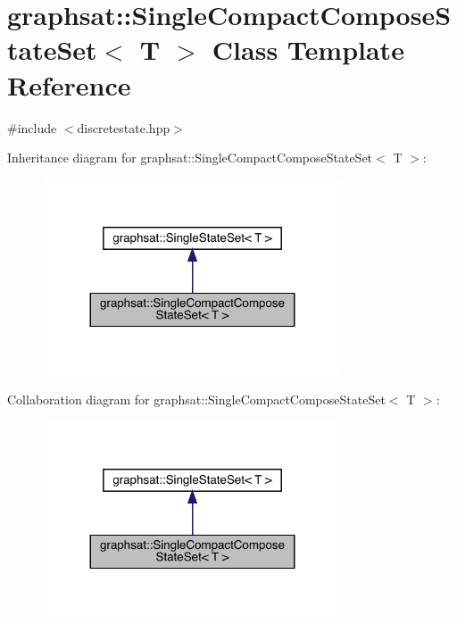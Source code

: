 \hypertarget{classgraphsat_1_1_single_compact_compose_state_set}{}\section{graphsat\+::Single\+Compact\+Compose\+State\+Set$<$ T $>$ Class Template Reference}
\label{classgraphsat_1_1_single_compact_compose_state_set}


{\ttfamily \#include $<$discretestate.\+hpp$>$}



Inheritance diagram for graphsat\+::Single\+Compact\+Compose\+State\+Set$<$ T $>$\+:\nopagebreak
\begin{figure}[H]
\begin{center}
\leavevmode
\includegraphics[width=251pt]{classgraphsat_1_1_single_compact_compose_state_set__inherit__graph}
\end{center}
\end{figure}


Collaboration diagram for graphsat\+::Single\+Compact\+Compose\+State\+Set$<$ T $>$\+:\nopagebreak
\begin{figure}[H]
\begin{center}
\leavevmode
\includegraphics[width=251pt]{classgraphsat_1_1_single_compact_compose_state_set__coll__graph}
\end{center}
\end{figure}
